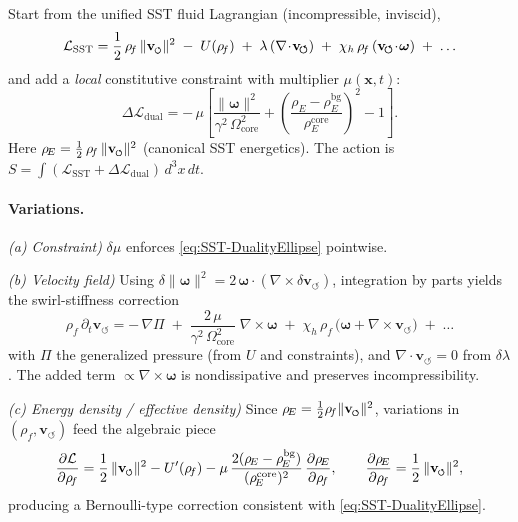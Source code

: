 \documentclass[10pt,reprint,aps,onecolumn,nofootinbib]{revtex4-2}
\newcommand{\vswirl}{\mathbf{v}_{\!\boldsymbol{\circlearrowleft}}}
\newcommand{\vnorm}{\lVert \mathbf{v}_{\mkern-2mu\scriptscriptstyle\boldsymbol{\circlearrowleft}} \rVert}               %
\newcommand{\rhoE}{\rho_{\!E}}                           %
\newcommand{\omegaVec}{\boldsymbol{\omega}}
\newcommand{\rhoF}{\rho_{\!f}}     %
\newcommand{\OmegaCore}{\Omega_{\mathrm{core}}}
\newcommand{\bg}{\mathrm{bg}}
\newcommand{\core}{\mathrm{core}}
\begin{document}
    Start from the unified SST fluid Lagrangian (incompressible, inviscid),
    \begin{equation}
        \mathcal L_{\text{SST}} =
        \frac12\,\rhoF\,\vnorm^{2}
        \;-\; U(\rhoF)
        \;+\;\lambda\,(\nabla\!\cdot\!\vswirl)
        \;+\;\chi_h\,\rhoF\,(\vswirl\!\cdot\!\omegaVec)
        \;+\;\ldots
    \end{equation}
    and add a \emph{local} constitutive constraint with multiplier $\mu(\mathbf x,t)$:
    \begin{equation}
        \Delta\mathcal L_{\text{dual}}
        = -\,\mu\!\left[
                      \frac{\lVert\omegaVec\rVert^{2}}{\gamma^{2}\,\OmegaCore^{2}}
                      +
                      \left(\frac{\rhoE-\rhoE^{\bg}}{\rhoE^{\core}}\right)^{2}
                      -1
        \right].
        \label{eq:dual-constraint-term}
    \end{equation}
    Here $\rhoE=\tfrac12\,\rhoF\,\vnorm^{2}$ (canonical SST energetics).
    The action is $S=\int (\mathcal L_{\text{SST}}+\Delta\mathcal L_{\text{dual}})\,d^3x\,dt$.

    \paragraph{Variations.}
        \emph{(a) Constraint)} $\delta\mu$ enforces \eqref{eq:SST-DualityEllipse} pointwise.

        \noindent\emph{(b) Velocity field)}
        Using $\delta\lVert\omegaVec\rVert^{2}=2\,\omegaVec\!\cdot\!(\nabla\times\delta\vswirl)$,
        integration by parts yields the swirl-stiffness correction
        \begin{equation}
            \rhoF\,\partial_t\vswirl
            = -\,\nabla\Pi \;+\; \frac{2\,\mu}{\gamma^{2}\,\OmegaCore^{2}}\;\nabla\times\omegaVec
            \;+\;\chi_h\,\rhoF\,\big(\omegaVec+\nabla\times\vswirl\big)
            \;+\;\ldots
            \label{eq:EL-velocity}
        \end{equation}
        with $\Pi$ the generalized pressure (from $U$ and constraints), and $\nabla\!\cdot\!\vswirl=0$ from $\delta\lambda$.
        The added term $\propto\nabla\times\omegaVec$ is nondissipative and preserves incompressibility.

        \noindent\emph{(c) Energy density / effective density)}
        Since $\rhoE=\tfrac12\rhoF\vnorm^2$, variations in $(\rhoF,\vswirl)$ feed the algebraic piece
        \begin{equation}
            \frac{\partial \mathcal L}{\partial \rhoF}
            = \frac12\,\vnorm^2 - U'(\rhoF)
            - \mu\,\frac{2(\rhoE-\rhoE^{\bg})}{(\rhoE^{\core})^{2}}\,\frac{\partial \rhoE}{\partial \rhoF},
            \qquad
            \frac{\partial \rhoE}{\partial \rhoF}=\frac12\,\vnorm^2,
        \end{equation}
        producing a Bernoulli-type correction consistent with \eqref{eq:SST-DualityEllipse}.
\end{document}
